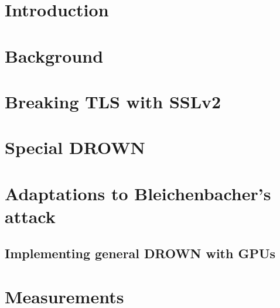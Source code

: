 \newcommand{\DrownPaper}{papers/drown/paper}
\newcommand{\DrownFigures}{papers/drown/figures}



\newif\ifext\extfalse
\newif\ifdraft\draftfalse
\newif\ifblind\blindtrue
\newif\ifsubmit\submitfalse

\draftfalse
\blindfalse





\section{Introduction}


\section{Background}


\section{Breaking TLS with SSLv2}


\section{Special DROWN}




\section{Adaptations to Bleichenbacher's attack}


\subsection{Implementing general DROWN with GPUs} 


\section{Measurements}


